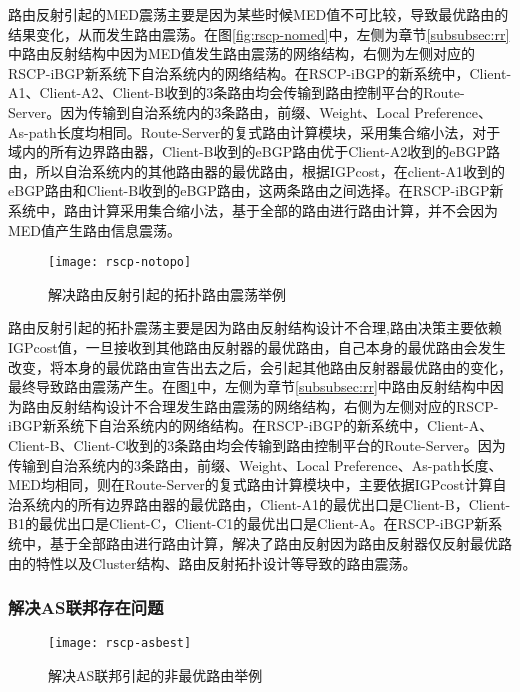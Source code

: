 路由反射引起的MED震荡主要是因为某些时候MED值不可比较，导致最优路由的结果变化，从而发生路由震荡。在图\ref{fig:rscp-nomed}中，左侧为章节\ref{subsubsec:rr}中路由反射结构中因为MED值发生路由震荡的网络结构，右侧为左侧对应的RSCP-iBGP新系统下自治系统内的网络结构。在RSCP-iBGP的新系统中，Client-A1、Client-A2、Client-B收到的3条路由均会传输到路由控制平台的Route-Server。因为传输到自治系统内的3条路由，前缀、Weight、Local Preference、As-path长度均相同。Route-Server的复式路由计算模块，采用集合缩小法，对于域内的所有边界路由器，Client-B收到的eBGP路由优于Client-A2收到的eBGP路由，所以自治系统内的其他路由器的最优路由，根据IGPcost，在client-A1收到的eBGP路由和Client-B收到的eBGP路由，这两条路由之间选择。在RSCP-iBGP新系统中，路由计算采用集合缩小法，基于全部的路由进行路由计算，并不会因为MED值产生路由信息震荡。\\


\begin{figure}
  \centering
  \texttt{[image: rscp-notopo]}
  \caption{解决路由反射引起的拓扑路由震荡举例}
  \label{fig:rscp-notopo}
\end{figure}


路由反射引起的拓扑震荡主要是因为路由反射结构设计不合理,路由决策主要依赖IGPcost值，一旦接收到其他路由反射器的最优路由，自己本身的最优路由会发生改变，将本身的最优路由宣告出去之后，会引起其他路由反射器最优路由的变化，最终导致路由震荡产生。在图\ref{fig:rscp-notopo}中，左侧为章节\ref{subsubsec:rr}中路由反射结构中因为路由反射结构设计不合理发生路由震荡的网络结构，右侧为左侧对应的RSCP-iBGP新系统下自治系统内的网络结构。在RSCP-iBGP的新系统中，Client-A、Client-B、Client-C收到的3条路由均会传输到路由控制平台的Route-Server。因为传输到自治系统内的3条路由，前缀、Weight、Local Preference、As-path长度、MED均相同，则在Route-Server的复式路由计算模块中，主要依据IGPcost计算自治系统内的所有边界路由器的最优路由，Client-A1的最优出口是Client-B，Client-B1的最优出口是Client-C，Client-C1的最优出口是Client-A。在RSCP-iBGP新系统中，基于全部路由进行路由计算，解决了路由反射因为路由反射器仅反射最优路由的特性以及Cluster结构、路由反射拓扑设计等导致的路由震荡。

\subsubsection{解决AS联邦存在问题}


\begin{figure}
  \centering
  \texttt{[image: rscp-asbest]}
  \caption{解决AS联邦引起的非最优路由举例}
  \label{fig:rscp-asbest}
\end{figure}

